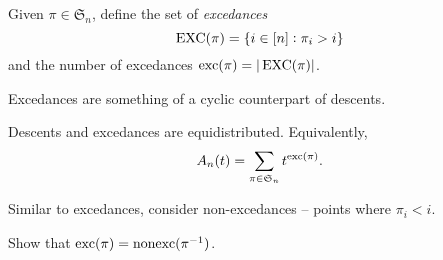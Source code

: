 	\begin{fdef}[Excedances]
		Given $\pi \in \mathfrak{S}_n$, define the set of \emph{excedances}
		\[ \operatorname{EXC}(\pi) = \{ i \in [n] : \pi_i > i \} \]
		and the number of excedances $\operatorname{exc}(\pi) = |\operatorname{EXC}(\pi)|$.
	\end{fdef}

	Excedances are something of a cyclic counterpart of descents. %

	\begin{ftheo}
		\label{theo: desc and exc}
		Descents and excedances are equidistributed. Equivalently,
		\[ A_n(t) = \sum_{\pi \in \mathfrak{S}_n} t^{\operatorname{exc}(\pi)}. \]
	\end{ftheo}
	Similar to excedances, consider non-excedances -- points where $\pi_i < i$.
	\begin{exercise}
		Show that $\operatorname{exc}(\pi) = \operatorname{nonexc}(\pi^{-1})$.
	\end{exercise}
